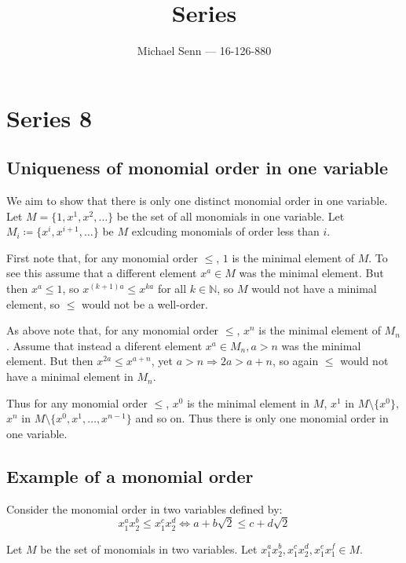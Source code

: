 \documentclass[a4paper]{scrreprt}
\title{Series \series}
\author{Michael Senn \maillink{michael.senn@students.unibe.ch} --- 16-126-880}
\date{\printdate}
\newcommand{\series}{8}
\begin{document}
\maketitle


\setcounter{chapter}{\numexpr \series - 1 \relax}

\chapter{Series \series}

\section{Uniqueness of monomial order in one variable}

We aim to show that there is only one distinct monomial order in one
variable. Let $M = \{1, x^1, x^2, \ldots\}$ be the set of all monomials in one
variable. Let $M_i \coloneqq \{x^i, x^{i+1}, \ldots \}$ be $M$ exlcuding
monomials of order less than $i$.

First note that, for any monomial order $\leq$, $1$ is the minimal element of
$M$. To see this assume that a different element $x^a \in M$ was the minimal
element. But then $x^a \leq 1$, so $x^{(k+1)a} \leq x^{ka}$ for all $k \in
\mathbb{N}$, so $M$ would not have a minimal element, so $\leq$ would not be a
well-order.

As above note that, for any monomial order $\leq$, $x^n$ is the minimal element
of $M_n$. Assume that instead a diferent element $x^a \in M_n, a > n$ was the
minimal element. But then $x^{2a} \leq x^{a + n}$, yet $a > n \Rightarrow 2a >
a+n$, so again $\leq$ would not have a minimal element in $M_n$.

Thus for any monomial order $\leq$, $x^0$ is the minimal element in $M$, $x^1$
in $M \setminus\{x^0\}$, $x^n$ in $M \setminus \{x^0, x^1, \ldots, x^{n-1}\}$ and
so on. Thus there is only one monomial order in one variable.

\section{Example of a monomial order}

Consider the monomial order in two variables defined by:
\[
		x_1^a x_2^b \leq x_1^c x_2^d \Leftrightarrow a + b \sqrt{2} \leq c + d \sqrt{2}
\]

Let $M$ be the set of monomials in two variables. Let $x_1^a x_2^b, x_1^c
x_2^d, x_1^e x_1^f \in M$.
\end{document}

